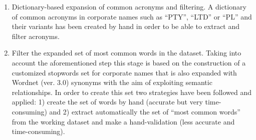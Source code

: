 \documentclass{llncs}
\begin{document}
\begin{enumerate}
%  

\item Dictionary-based expansion of common acronyms and filtering. A dictionary of common acronyms in corporate 
names such as ``PTY'', ``LTD'' or ``PL'' and their variants has been created by hand in order 
to be able to extract and filter acronyms. 


\item Filter the expanded set of most common words in the dataset. Taking into account 
the aforementioned step this stage is based on the construction of a customized stopwords 
set for corporate names that is also expanded with Wordnet (ver. 3.0) synonyms with the aim of 
exploiting semantic relationships. In order to create this set two strategies have been followed and applied: 1) create the set 
of words by hand (accurate but very time-consuming) and 2) extract automatically the set of ``most common words'' from the 
working dataset and make a hand-validation (less accurate and time-consuming). 
    
%
%




\end{enumerate}
\end{document}
